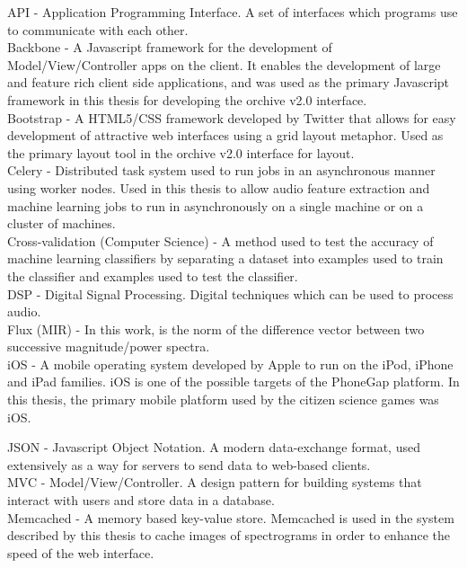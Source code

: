 \documentclass[12pt,oneside]{book}
\begin{document}
API - Application Programming Interface.  A set of interfaces which
programs use to communicate with each other. \\

Backbone - A Javascript framework for the development of
Model/View/Controller apps on the client.  It enables the development
of large and feature rich client side applications, and was used as
the primary Javascript framework in this thesis for developing the
orchive v2.0 interface.\\

Bootstrap - A HTML5/CSS framework developed by Twitter that allows for
easy development of attractive web interfaces using a grid layout
metaphor.  Used as the primary layout tool in the orchive v2.0
interface for layout.\\

Celery - Distributed task system used to run jobs in an asynchronous
manner using worker nodes.  Used in this thesis to allow audio feature
extraction and machine learning jobs to run in asynchronously on a
single machine or on a cluster of machines.\\

Cross-validation (Computer Science) - A method used to test the
accuracy of machine learning classifiers by separating a dataset into
examples used to train the classifier and examples used to test the
classifier.\\

DSP - Digital Signal Processing.  Digital techniques which can be used
to process audio.  \\

Flux (MIR) - In this work, is the norm of the difference vector
between two successive magnitude/power spectra.  \\

iOS - A mobile operating system developed by Apple to run on the iPod,
iPhone and iPad families.  iOS is one of the possible targets of the
PhoneGap platform.  In this thesis, the primary mobile platform used
by the citizen science games was iOS.

JSON - Javascript Object Notation.  A modern data-exchange format,
used extensively as a way for servers to send data to web-based
clients.\\

MVC - Model/View/Controller.  A design pattern for building systems
that interact with users and store data in a database. \\

Memcached - A memory based key-value store.  Memcached is used in the
system described by this thesis to cache images of spectrograms in
order to enhance the speed of the web interface.\\
\end{document}
